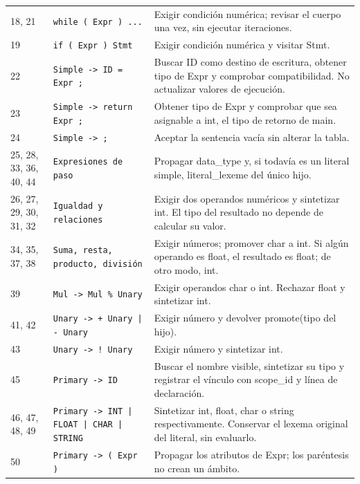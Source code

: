 {\begin{longtable}{p{1.4cm}p{4.5cm}p{9.6cm}}
18, 21 & \texttt{while ( Expr ) ...} & Exigir condición numérica; revisar el cuerpo una vez, sin ejecutar iteraciones.\\
19 & \texttt{if ( Expr ) Stmt} & Exigir condición numérica y visitar Stmt.\\
22 & \texttt{Simple -\textgreater{} ID = Expr ;} & Buscar ID como destino de escritura, obtener tipo de Expr y comprobar compatibilidad. No actualizar valores de ejecución.\\
23 & \texttt{Simple -\textgreater{} return Expr ;} & Obtener tipo de Expr y comprobar que sea asignable a int, el tipo de retorno de main.\\
24 & \texttt{Simple -\textgreater{} ;} & Aceptar la sentencia vacía sin alterar la tabla.\\
25, 28, 33, 36, 40, 44 & \texttt{Expresiones de paso} & Propagar data\_type y, si todavía es un literal simple, literal\_lexeme del único hijo.\\
26, 27, 29, 30, 31, 32 & \texttt{Igualdad y relaciones} & Exigir dos operandos numéricos y sintetizar int. El tipo del resultado no depende de calcular su valor.\\
34, 35, 37, 38 & \texttt{Suma, resta, producto, división} & Exigir números; promover char a int. Si algún operando es float, el resultado es float; de otro modo, int.\\
39 & \texttt{Mul -\textgreater{} Mul \% Unary} & Exigir operandos char o int. Rechazar float y sintetizar int.\\
41, 42 & \texttt{Unary -\textgreater{} + Unary | - Unary} & Exigir número y devolver promote(tipo del hijo).\\
43 & \texttt{Unary -\textgreater{} ! Unary} & Exigir número y sintetizar int.\\
45 & \texttt{Primary -\textgreater{} ID} & Buscar el nombre visible, sintetizar su tipo y registrar el vínculo con scope\_id y línea de declaración.\\
46, 47, 48, 49 & \texttt{Primary -\textgreater{} INT | FLOAT | CHAR | STRING} & Sintetizar int, float, char o string respectivamente. Conservar el lexema original del literal, sin evaluarlo.\\
50 & \texttt{Primary -\textgreater{} ( Expr )} & Propagar los atributos de Expr; los paréntesis no crean un ámbito.\\
\bottomrule\end{longtable}}
